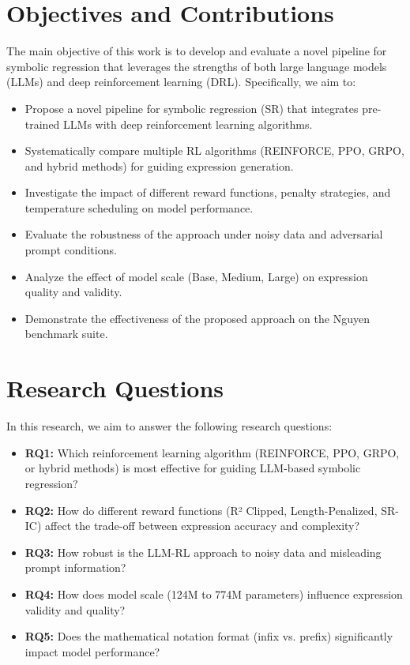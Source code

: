 \section{Objectives and Contributions}

The main objective of this work is to develop and evaluate a novel pipeline for symbolic regression that leverages the strengths of both large language models (LLMs) and deep reinforcement learning (DRL). Specifically, we aim to:

\begin{itemize}
\item Propose a novel pipeline for symbolic regression (SR) that integrates pre-trained LLMs with deep reinforcement learning algorithms.
\item Systematically compare multiple RL algorithms (REINFORCE, PPO, GRPO, and hybrid methods) for guiding expression generation.
\item Investigate the impact of different reward functions, penalty strategies, and temperature scheduling on model performance.
\item Evaluate the robustness of the approach under noisy data and adversarial prompt conditions.
\item Analyze the effect of model scale (Base, Medium, Large) on expression quality and validity.
\item Demonstrate the effectiveness of the proposed approach on the Nguyen benchmark suite.
\end{itemize}

\section{Research Questions}

In this research, we aim to answer the following research questions:

\begin{itemize}
\item \textbf{RQ1:} Which reinforcement learning algorithm (REINFORCE, PPO, GRPO, or hybrid methods) is most effective for guiding LLM-based symbolic regression?
\item \textbf{RQ2:} How do different reward functions (R² Clipped, Length-Penalized, SR-IC) affect the trade-off between expression accuracy and complexity?
\item \textbf{RQ3:} How robust is the LLM-RL approach to noisy data and misleading prompt information?
\item \textbf{RQ4:} How does model scale (124M to 774M parameters) influence expression validity and quality?
\item \textbf{RQ5:} Does the mathematical notation format (infix vs. prefix) significantly impact model performance?
\end{itemize}

